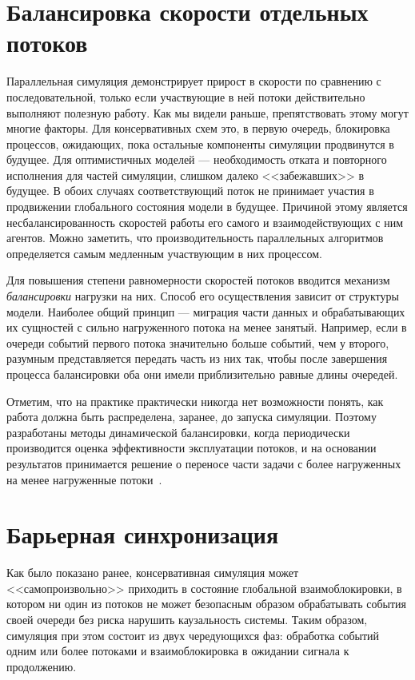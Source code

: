 \section{Балансировка скорости отдельных потоков}

Параллельная симуляция демонстрирует прирост в скорости по сравнению с последовательной, только если участвующие в ней потоки действительно выполняют полезную работу. Как мы видели раньше, препятствовать этому могут многие факторы. Для консервативных схем это, в первую очередь, блокировка процессов, ожидающих, пока остальные компоненты симуляции продвинутся в будущее. Для оптимистичных моделей — необходимость отката и повторного исполнения для частей симуляции, слишком далеко <<забежавших>> в будущее. В обоих случаях соответствующий поток не принимает участия в продвижении глобального состояния модели в будущее. Причиной этому является несбалансированность скоростей работы его самого и взаимодействующих с ним агентов. Можно заметить, что производительность параллельных алгоритмов определяется самым медленным участвующим в них процессом.

Для повышения степени равномерности скоростей потоков вводится механизм \textit{балансировки} нагрузки на них. Способ его осуществления зависит от структуры модели. Наиболее общий принцип — миграция части данных и обрабатывающих их сущностей с сильно нагруженного потока на менее занятый. Например, если в очереди событий первого потока значительно больше событий, чем у второго, разумным представляется передать часть из них так, чтобы после завершения процесса балансировки оба они имели приблизительно равные длины очередей.

Отметим, что на практике практически никогда нет возможности понять, как работа должна быть распределена, заранее, до запуска симуляции. Поэтому разработаны методы динамической балансировки, когда периодически производится оценка эффективности эксплуатации потоков, и на основании результатов принимается решение о переносе части задачи с более нагруженных на менее нагруженные потоки~\cite{DBLP:conf/pads/PeschlowHM07}.

\section{Барьерная синхронизация}

Как было показано ранее, консервативная симуляция может <<самопроизвольно>> приходить в состояние глобальной взаимоблокировки, в котором ни один из потоков не может безопасным образом обрабатывать события своей очереди без риска нарушить каузальность системы. Таким образом, симуляция при этом состоит из двух чередующихся фаз: обработка событий одним или более потоками и взаимоблокировка в ожидании сигнала к продолжению.


